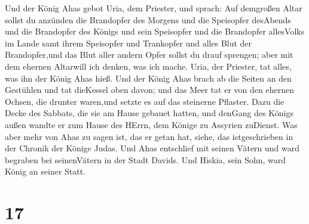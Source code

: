  Und der König Ahas gebot Uria, dem Priester, und sprach:
Auf demgroßen Altar sollst du anzünden die Brandopfer des Morgens und
die Speisopfer desAbends und die Brandopfer des Königs und sein
Speisopfer und die Brandopfer allesVolks im Lande samt ihrem Speisopfer
und Trankopfer und alles Blut der Brandopfer,und das Blut aller andern
Opfer sollst du drauf sprengen; aber mit dem ehernen Altarwill ich
denken, was ich mache.  Uria, der Priester, tat alles, was
ihn der König Ahas hieß.  Und der König Ahas brach ab die
Seiten an den Gestühlen und tat dieKessel oben davon; und das Meer tat
er von den ehernen Ochsen, die drunter waren,und setzte es auf das
steinerne Pflaster.  Dazu die Decke des Sabbats, die sie am
Hause gebauet hatten, und denGang des Königs außen wandte er zum Hause
des HErrn, dem Könige zu Assyrien zuDienst.  Was aber mehr
von Ahas zu sagen ist, das er getan hat, siehe, das istgeschrieben in
der Chronik der Könige Judas.  Und Ahas entschlief mit
seinen Vätern und ward begraben bei seinenVätern in der Stadt Davids.
Und Hiskia, sein Sohn, ward König an seiner Statt.

\hypertarget{section-16}{%
\section{17}\label{section-16}}

